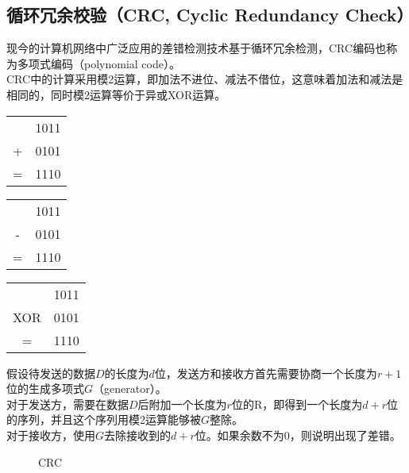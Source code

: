 \vspace{0.5cm}

\subsection{循环冗余校验（CRC, Cyclic Redundancy Check）}

现今的计算机网络中广泛应用的差错检测技术基于循环冗余检测，CRC编码也称为多项式编码（polynomial code）。\\

CRC中的计算采用模2运算，即加法不进位、减法不借位，这意味着加法和减法是相同的，同时模2运算等价于异或XOR运算。

\begin{table}[H]
    \centering
    \begin{tabular}{cD{.}{.}{3}}
          & 1011 \\
        + & 0101 \\
        \hline
        = & 1110
    \end{tabular}
    \begin{tabular}{cD{.}{.}{3}}
          & 1011 \\
        - & 0101 \\
        \hline
        = & 1110
    \end{tabular}
    \begin{tabular}{cD{.}{.}{3}}
            & 1011 \\
        XOR & 0101 \\
        \hline
        =   & 1110
    \end{tabular}
\end{table}

假设待发送的数据$ D $的长度为$ d $位，发送方和接收方首先需要协商一个长度为$ r + 1 $位的生成多项式$ G $（generator）。\\

对于发送方，需要在数据$ D $后附加一个长度为$ r $位的R，即得到一个长度为$ d + r $位的序列，并且这个序列用模2运算能够被$ G $整除。\\

对于接收方，使用$ G $去除接收到的$ d + r $位。如果余数不为0，则说明出现了差错。\\

\begin{figure}[H]
    \centering
    \caption{CRC}
\end{figure}

